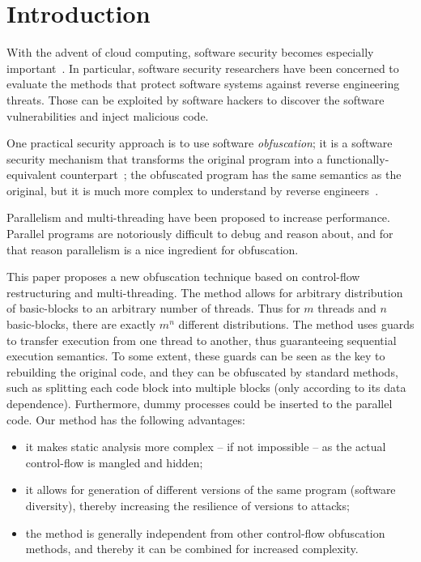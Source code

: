\documentclass[3p,times,procedia,twocolumn,letterpaper]{elsarticle}
\begin{document}
\section{Introduction}

With the advent of cloud computing, software security becomes especially important~\cite{a}. In particular, software security researchers have been concerned to evaluate the methods that protect software systems against reverse engineering threats. Those can be exploited by software hackers to discover the software vulnerabilities and inject malicious code. 

One practical security approach is to use software \emph{obfuscation}; it is a software security
mechanism that transforms the original program into a functionally-equivalent counterpart~\cite{b,d}; the obfuscated program has the same semantics as the original, but it is much more complex to understand by reverse engineers~\cite{w}.

Parallelism and multi-threading have been proposed to increase performance. Parallel programs are notoriously difficult to debug and reason about, and for that reason parallelism is a nice ingredient for
obfuscation. 

This paper proposes a new obfuscation technique based on control-flow restructuring and multi-threading. The method allows for arbitrary distribution of basic-blocks to an arbitrary number of threads. Thus for $m$ threads and $n$ basic-blocks, there are exactly $m^n$ different distributions. The method uses guards to transfer execution from one thread to another, thus guaranteeing sequential execution semantics. To some extent, these guards can be seen as the key to rebuilding the original code, and they can be obfuscated by standard methods, such as splitting each code block into multiple blocks (only according to its data dependence). Furthermore, dummy processes could be inserted to the parallel code. Our method has the following advantages:

\begin{itemize}
\item it makes static analysis more complex -- if not impossible -- as the actual control-flow is mangled and hidden;
\item it allows for generation of different versions of the same program (software diversity), thereby increasing the resilience of versions to attacks;
\item the method is generally independent from other control-flow obfuscation methods, and thereby it can be combined for increased complexity.
\end{itemize}
\end{document}
